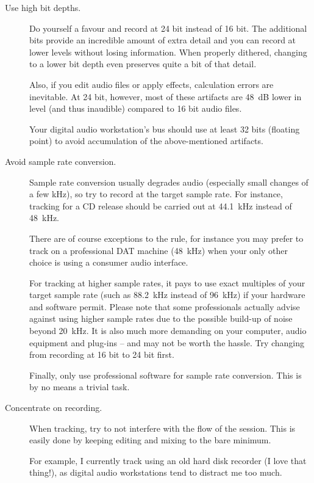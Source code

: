\begin{description}
\item[Use high bit depths.]  Do yourself a favour and record at 24 bit
  instead of 16 bit.  The additional bits provide an incredible amount
  of extra detail and you can record at lower levels without losing
  information.  When properly dithered, changing to a lower bit depth
  even preserves quite a bit of that detail.

  Also, if you edit audio files or apply effects, calculation errors
  are inevitable.  At 24 bit, however, most of these artifacts are
  \SI{48}{\dB} lower in level (and thus inaudible) compared to 16 bit
  audio files.

  Your digital audio workstation's bus should use at least 32 bits
  (floating point) to avoid accumulation of the above-mentioned
  artifacts.

\item[Avoid sample rate conversion.]  Sample rate conversion usually
  degrades audio (especially small changes of a few \si{\kilo\hertz}),
  so try to record at the target sample rate.  For instance, tracking
  for a CD release should be carried out at \SI{44.1}{\kilo\hertz}
  instead of \SI{48}{\kilo\hertz}.

  There are of course exceptions to the rule, for instance you may
  prefer to track on a professional DAT machine (\SI{48}{\kilo\hertz})
  when your only other choice is using a consumer audio interface.

  For tracking at higher sample rates, it pays to use exact multiples
  of your target sample rate (such as \SI{88.2}{\kilo\hertz} instead
  of \SI{96}{\kilo\hertz}) if your hardware and software permit.
  Please note that some professionals actually advise against using
  higher sample rates due to the possible build-up of noise beyond
  \SI{20}{\kilo\hertz}.  It is also much more demanding on your
  computer, audio equipment and plug-ins -- and may not be worth the
  hassle.  Try changing from recording at 16 bit to 24 bit first.

  Finally, only use professional software for sample rate conversion.
  This is by no means a trivial task.

\item[Concentrate on recording.]  When tracking, try to not interfere
  with the flow of the session.  This is easily done by keeping
  editing and mixing to the bare minimum.

  For example, I currently track using an old hard disk recorder (I
  love that thing!), as digital audio workstations tend to distract me
  too much.


\end{description}
